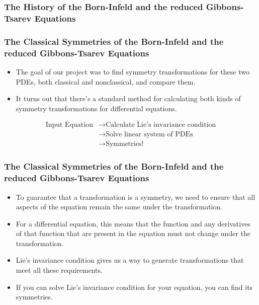 \documentclass{beamer}
\begin{document}
\begin{frame}
    \frametitle{The History of the Born-Infeld and the reduced Gibbons-Tsarev Equations}

\end{frame}


\begin{frame}
    \frametitle{The Classical Symmetries of the Born-Infeld and the reduced Gibbons-Tsarev Equations}
    \begin{itemize}
        \item The goal of our project was to find symmetry transformations for these two PDEs, both classical and nonclassical, and compare them.
        \item It turns out that there's a standard method for calculating both kinds of symmetry transformations for differential equations.
    \end{itemize}
    \vspace*{0.125in}
    \begin{large}
        \begin{align*}
            \text{Input Equation} &\rightarrow \text{Calculate Lie's invariance condition} \\
                           &\rightarrow \text{Solve linear system of PDEs} \\
                           &\rightarrow \text{Symmetries!}
        \end{align*}
    \end{large}

\end{frame}


\begin{frame}
    \frametitle{The Classical Symmetries of the Born-Infeld and the reduced Gibbons-Tsarev Equations}
    \begin{itemize}
        \item To guarantee that a transformation is a symmetry, we need to ensure that all aspects of the equation remain the same under the transformation. \pause
        \item For a differential equation, this means that the function and any derivatives of that function that are present in the equation must not change under the transformation. \pause
        \item Lie's invariance condition gives us a way to generate transformations that meet all these requirements. \pause
        \item If you can solve Lie's invariance condition for your equation, you can find its symmetries.
    \end{itemize}
\end{frame}
\end{document}
